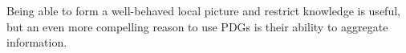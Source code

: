 \documentclass{article}
\theoremstyle{plain}
\theoremstyle{definition}
\newenvironment{example}
	{\pushQED{\qed}\renewcommand{\qedsymbol}{$\triangle$}\examplex}
	{\popQED\endexamplex%
}
\theoremstyle{remark}
\newcommand{\MN}{PDG}
\numberwithin{equation}{section}
\begin{document}
\begin{example}[restriction]
	\end{example}

 	Being able to form a well-behaved local picture and restrict
        knowledge is useful, but an even more compelling 
        reason to use PDGs is their ability to aggregate information. 
	
\end{document}

